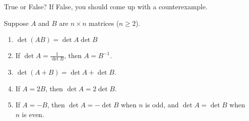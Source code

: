 \documentclass{ximera}
\author{}
\begin{document}
\begin{exercise}

True or False?  If False, you should come up with a counterexample.  

Suppose $A$ and $B$ are $n\times n$ matrices ($n\geq 2$).

 \begin{enumerate}
 \item $\det{(AB)}=\det{A}\det{B}$

 \begin{multipleChoice}
 \end{multipleChoice}

 \item If $\det{A}=\frac{1}{\det{B}}$, then $A=B^{-1}$.

 \begin{multipleChoice}
 \end{multipleChoice}

\item $\det{(A+B)}=\det{A}+\det{B}$.

 \begin{multipleChoice}
 \end{multipleChoice}

 \item If $A=2B$, then $\det{A}=2\det{B}$.

 \begin{multipleChoice}
 \end{multipleChoice}

 \item If $A=-B$, then $\det{A}=-\det{B}$ when $n$ is odd, and $\det{A}=\det{B}$ when $n$ is even.

 \begin{multipleChoice}
 \end{multipleChoice}

 
 \end{enumerate}

 
\end{exercise}
\end{document}
